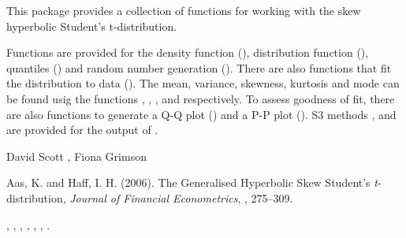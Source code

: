 \begin{Description}\relax
This package provides a collection of functions for working with the
skew hyperbolic Student's t-distribution.

Functions are provided for the density function (),
distribution function (), quantiles () and
random number generation (). There are also functions
that fit the distribution to data (). The mean,
variance, skewness, kurtosis and mode can be found usig the functions
, , ,
 and  respectively. To assess
goodness of fit, there are also functions to generate a Q-Q plot
() and a P-P plot (). S3 methods
,  and  are provided for the output
of .

\end{Description}
\begin{Author}\relax
David Scott , Fiona Grimson
\end{Author}
\begin{References}\relax
Aas, K. and Haff, I. H. (2006).
The Generalised Hyperbolic Skew Student's \emph{t}-distribution,
\emph{Journal of Financial Econometrics}, , 275--309.
\end{References}
\begin{SeeAlso}\relax
{}, ,
, ,
, ,
.
\end{SeeAlso}

